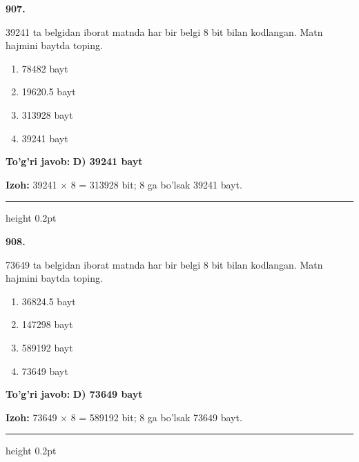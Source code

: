 \documentclass[10pt,a4paper,oneside]{article}
\begin{document}
\noindent\textbf{\color{ink}907.}
\par
39241 ta belgidan iborat matnda har bir belgi 8 bit bilan kodlangan. Matn hajmini baytda toping.
\begin{enumerate}[label=\Alph*),leftmargin=9mm]
\item 78482 bayt
\item 19620.5 bayt
\item 313928 bayt
\item 39241 bayt
\end{enumerate}
\begin{tcolorbox}[enhanced,breakable,colback=teal!4,colframe=teal!50!black,boxrule=0.5pt,arc=1.1mm,left=3mm,right=3mm,top=1.7mm,bottom=1.7mm,before skip=2mm,after skip=2mm]
\textbf{\color{teal}To'g'ri javob:} \textbf{D) 39241 bayt}
\par\smallskip
\textbf{Izoh:} 39241 \ensuremath{\times} 8 = 313928 bit; 8 ga bo'lsak 39241 bayt.
\end{tcolorbox}
\vspace{2mm}\hrule height 0.2pt \vspace{3mm}

\noindent\textbf{\color{ink}908.}
\par
73649 ta belgidan iborat matnda har bir belgi 8 bit bilan kodlangan. Matn hajmini baytda toping.
\begin{enumerate}[label=\Alph*),leftmargin=9mm]
\item 36824.5 bayt
\item 147298 bayt
\item 589192 bayt
\item 73649 bayt
\end{enumerate}
\begin{tcolorbox}[enhanced,breakable,colback=teal!4,colframe=teal!50!black,boxrule=0.5pt,arc=1.1mm,left=3mm,right=3mm,top=1.7mm,bottom=1.7mm,before skip=2mm,after skip=2mm]
\textbf{\color{teal}To'g'ri javob:} \textbf{D) 73649 bayt}
\par\smallskip
\textbf{Izoh:} 73649 \ensuremath{\times} 8 = 589192 bit; 8 ga bo'lsak 73649 bayt.
\end{tcolorbox}
\vspace{2mm}\hrule height 0.2pt \vspace{3mm}
\end{document}
